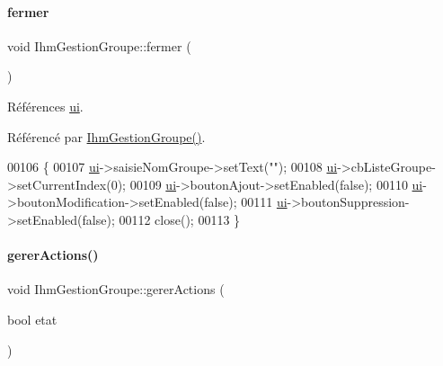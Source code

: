 \paragraph{\texorpdfstring{fermer}{fermer}}
{\footnotesize\ttfamily void Ihm\+Gestion\+Groupe\+::fermer (\begin{DoxyParamCaption}{ }\end{DoxyParamCaption})\hspace{0.3cm}{\ttfamily [slot]}}



Références \hyperlink{class_ihm_gestion_groupe_a9785ad3dadc1d2cad8558ca8b682dffd}{ui}.



Référencé par \hyperlink{class_ihm_gestion_groupe_a27632f9cf5b66f4403c3534ee0e0ad18}{Ihm\+Gestion\+Groupe()}.


\begin{DoxyCode}
00106 \{
00107     \hyperlink{class_ihm_gestion_groupe_a9785ad3dadc1d2cad8558ca8b682dffd}{ui}->saisieNomGroupe->setText(\textcolor{stringliteral}{""});
00108     \hyperlink{class_ihm_gestion_groupe_a9785ad3dadc1d2cad8558ca8b682dffd}{ui}->cbListeGroupe->setCurrentIndex(0);
00109     \hyperlink{class_ihm_gestion_groupe_a9785ad3dadc1d2cad8558ca8b682dffd}{ui}->boutonAjout->setEnabled(\textcolor{keyword}{false});
00110     \hyperlink{class_ihm_gestion_groupe_a9785ad3dadc1d2cad8558ca8b682dffd}{ui}->boutonModification->setEnabled(\textcolor{keyword}{false});
00111     \hyperlink{class_ihm_gestion_groupe_a9785ad3dadc1d2cad8558ca8b682dffd}{ui}->boutonSuppression->setEnabled(\textcolor{keyword}{false});
00112     close();
00113 \}
\end{DoxyCode}
\mbox{\label{class_ihm_gestion_groupe_a9e6a325b8845fb3c22157b2b59436610}} 
\paragraph{\texorpdfstring{gerer\+Actions()}{gererActions()}}
{\footnotesize\ttfamily void Ihm\+Gestion\+Groupe\+::gerer\+Actions (\begin{DoxyParamCaption}\item[{bool}]{etat }\end{DoxyParamCaption})\hspace{0.3cm}{\ttfamily [private]}}


